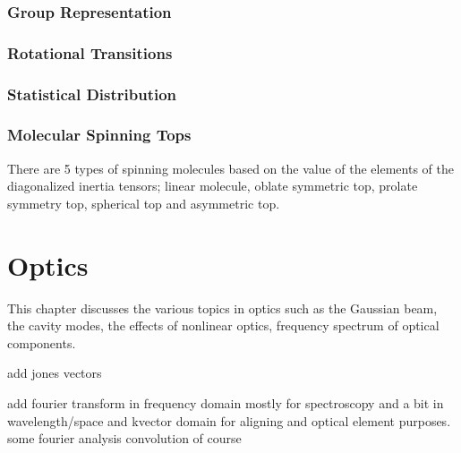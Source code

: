 \documentclass[11pt,a4paper]{book}
\begin{document}
		\subsection{Group Representation}
			\label{subsec:Group Representation}
			
		\subsection{Rotational Transitions}
			\label{subsec:Rotational Transitions}
			
		\subsection{Statistical Distribution}
			\label{subsec:Statistical Distribution}
			
		\subsection{Molecular Spinning Tops}	
			\label{subsec:Molecular Spinning Tops}
			There are 5 types of spinning molecules based on the value of the elements of the diagonalized inertia tensors; linear molecule, oblate symmetric top, prolate symmetry top, spherical top and asymmetric top.
			
\chapter{Optics}
	This chapter discusses the various topics in optics such as the Gaussian beam, the cavity modes, the effects of nonlinear optics, frequency spectrum of optical components.
	
	add jones vectors
	
	add fourier transform in frequency domain mostly for spectroscopy and a bit in wavelength/space and kvector domain for aligning and optical element purposes. some fourier analysis convolution of course
	
\end{document}
